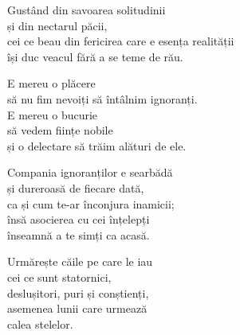 Gustând din savoarea solitudinii\\
și din nectarul păcii,\\
cei ce beau din fericirea care e esența realității\\
își duc veacul fără a se teme de rău.


E mereu o plăcere\\
să nu fim nevoiți să întâlnim ignoranți.\\
E mereu o bucurie\\
să vedem ființe nobile\\
și o delectare să trăim alături de ele.


Compania ignoranților e searbădă\\
și dureroasă de fiecare dată,\\
ca și cum te-ar înconjura inamicii;\\
însă asocierea cu cei înțelepți\\
înseamnă a te simți ca acasă.


Urmărește căile pe care le iau\\
cei ce sunt statornici,\\
deslușitori, puri și conștienți,\\
asemenea lunii care urmează\\
calea stelelor.
